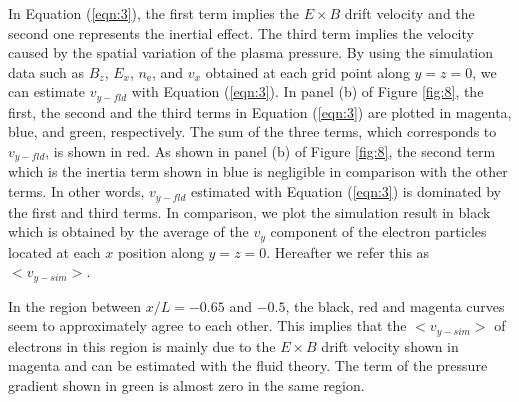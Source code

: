 \documentclass[draft,jgrga]{agutex2015}
\begin{document}
\begin{article}
In Equation (\ref{eqn:3}), 
the first term implies the $E \times B$ drift velocity and 
the second one represents the inertial effect. 
The third term implies the velocity caused 
by the spatial variation of the plasma pressure. 
By using the simulation data such as $B_z$, $E_x$, $n_\mathrm{e}$, and $v_x$
obtained at each grid point along $y=z=0$, 
we can estimate $v_{y-fld}$ with Equation (\ref{eqn:3}). 
In panel (b) of Figure \ref{fig:8}, 
the first, the second and the third terms in Equation (\ref{eqn:3}) are plotted 
in magenta, blue, and green, respectively.  
The sum of the three terms, which corresponds to $v_{y-fld}$,
is shown in red. 
As shown in panel (b) of Figure \ref{fig:8},
the second term which is the inertia term shown in blue is negligible 
in comparison with the other terms. 
In other words, $v_{y-fld}$ estimated with Equation (\ref{eqn:3}) is 
dominated by the first and third terms. 
In comparison, 
we plot the simulation result in black which is obtained 
by the average of the $v_y$ component of the electron particles 
located at each $x$ position along $y=z=0$.
Hereafter we refer this as $<v_{y-sim}>$. 

In the region between $x/L=-0.65$ and $-0.5$, 
the black, red and magenta curves seem to approximately agree to each other. 
This implies that the $<v_{y-sim}>$ of electrons in this region 
is mainly due to the $E \times B$ drift velocity shown in magenta
and can be estimated with the fluid theory. 
The term of the pressure gradient shown in green is almost zero 
in the same region.  


\end{article}
\end{document}
